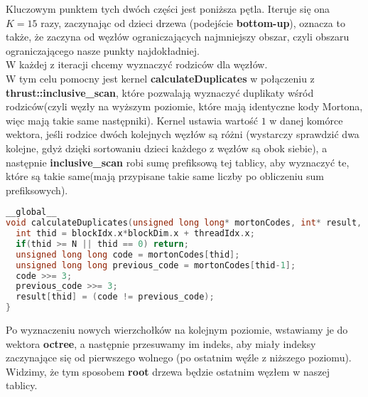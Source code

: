 \documentclass[14pt,twoside,a4paper]{article}
\theoremstyle{definition}
\begin{document}
Kluczowym punktem tych dwóch części jest poniższa pętla. Iteruje się ona $K=15$ razy, zaczynając od dzieci drzewa (podejście \textbf{bottom-up}), oznacza to także, że zaczyna od węzłów ograniczających najmniejszy obszar, czyli obszaru ograniczającego nasze punkty najdokładniej.\\
W każdej z iteracji chcemy wyznaczyć rodziców dla węzłów. \\W tym celu pomocny jest kernel \textbf{calculateDuplicates} w połączeniu z \textbf{thrust::inclusive\_scan}, które pozwalają wyznaczyć duplikaty wśród rodziców(czyli węzły na wyższym poziomie, które mają identyczne kody Mortona, więc mają takie same następniki).
Kernel ustawia wartość $1$ w danej komórce wektora, jeśli rodzice dwóch kolejnych węzłów są różni (wystarczy sprawdzić dwa kolejne, gdyż dzięki sortowaniu dzieci każdego z węzłów są obok siebie), a następnie \textbf{inclusive\_scan} robi sumę prefiksową tej tablicy, aby wyznaczyć te, które są takie same(mają przypisane takie same liczby po obliczeniu sum prefiksowych).
\bigskip
{}              
\begin{lstlisting}[language=C++, frame=single, framerule=2pt, caption=Kernel calculateDuplicates]
__global__
void calculateDuplicates(unsigned long long* mortonCodes, int* result, int N) {
  int thid = blockIdx.x*blockDim.x + threadIdx.x;
  if(thid >= N || thid == 0) return;
  unsigned long long code = mortonCodes[thid];
  unsigned long long previous_code = mortonCodes[thid-1];
  code >>= 3;
  previous_code >>= 3;
  result[thid] = (code != previous_code);
}

\end{lstlisting}
\bigskip
Po wyznaczeniu nowych wierzchołków na kolejnym poziomie, wstawiamy je do wektora \textbf{octree}, a następnie przesuwamy im indeks, aby miały indeksy zaczynające się od pierwszego wolnego (po ostatnim węźle z niższego poziomu). Widzimy, że tym sposobem \textbf{root} drzewa będzie ostatnim węzłem w naszej tablicy.
\end{document}
